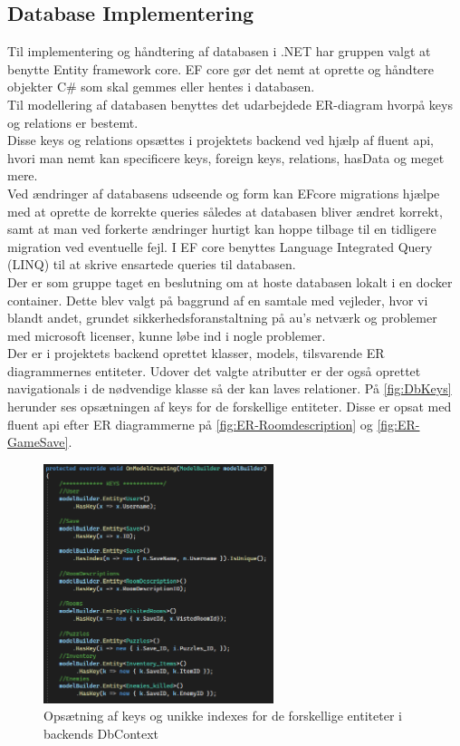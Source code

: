\subsection{Database Implementering}
\label{Section: DB-Implementering}
Til implementering og håndtering af databasen i .NET har gruppen valgt at benytte Entity framework core.
EF core gør det nemt at oprette og håndtere objekter C\# som skal gemmes eller hentes i databasen.\\
Til modellering af databasen benyttes det udarbejdede ER-diagram hvorpå keys og relations er bestemt.\\
Disse keys og relations opsættes i projektets backend ved hjælp af fluent api, hvori man nemt kan specificere keys, foreign keys, relations, hasData og meget mere.\\
Ved ændringer af databasens udseende og form kan EFcore migrations hjælpe med at oprette de korrekte queries således at databasen bliver ændret korrekt, samt at man ved forkerte ændringer hurtigt kan hoppe tilbage til en tidligere migration ved eventuelle fejl. I EF core benyttes Language Integrated Query (LINQ) til at skrive ensartede queries til databasen.\\
Der er som gruppe taget en beslutning om at hoste databasen lokalt i en docker container. Dette blev valgt på baggrund af en samtale med vejleder, hvor vi blandt andet, grundet sikkerhedsforanstaltning på au’s netværk og problemer med microsoft licenser, kunne løbe ind i nogle problemer.\\

\noindent Der er i projektets backend oprettet klasser, models, tilsvarende ER diagrammernes entiteter. Udover det valgte atributter er der også oprettet navigationals i de nødvendige klasse så der kan laves relationer.
På \autoref{fig:DbKeys} herunder ses opsætningen af keys for de forskellige entiteter. Disse er opsat med fluent api efter ER diagrammerne på \autoref{fig:ER-Roomdescription} og \autoref{fig:ER-GameSave}.

\begin{figure}[H]
\centering
\includegraphics[width = 0.6\textwidth]{02-Body/Images/DAL-Database/DbKeys.PNG}
\caption{Opsætning af keys og unikke indexes for de forskellige entiteter i backends DbContext}
\label{fig:DbKeys}
\end{figure}

